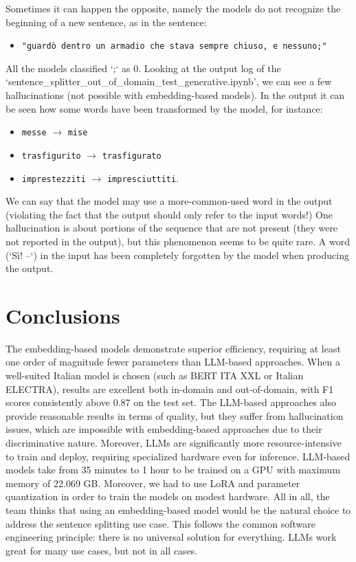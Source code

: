 \documentclass[11pt]{article}
\begin{document}
Sometimes it can happen the opposite, namely the models do not recognize the beginning of a new sentence, as in the sentence: 
\begin{itemize}
    \item \texttt{"guardò dentro un armadio che stava sempre
chiuso, e nessuno;"}
\end{itemize}
All the models classified `;` as 0.   
Looking at the output log of the `sentence\_splitter\_out\_of\_domain\_test\_generative.ipynb', we can see a few hallucinations (not possible with embedding-based models). \newline In the output it can be seen how some words have been transformed by the model, for instance:
\begin{itemize}
    \item \texttt{messe} $\rightarrow$ \texttt{mise}
    \item \texttt{trasfigurito} $\rightarrow$ \texttt{trasfigurato}
    \item \texttt{imprestezziti} $\rightarrow$ \texttt{impresciuttiti}.
\end{itemize} 
We can say that the model may use a more-common-used word in the output (violating the fact that the output should only refer to the input words!) \newline One hallucination is about portions of the sequence that are not present (they were not reported in the output), but this phenomenon seems to be quite rare. \newline A word (`Sì! –`) in the input has been completely forgotten by the model when producing the output.

\section{Conclusions}
The embedding-based models demonstrate superior efficiency, requiring at least one order of magnitude fewer parameters than LLM-based approaches. When a well-suited Italian model is chosen (such as BERT ITA XXL or Italian ELECTRA), results are excellent both in-domain and out-of-domain, with F1 scores consistently above 0.87 on the test set. \newline 
The LLM-based approaches also provide reasonable results in terms of quality, but they suffer from hallucination issues, which are impossible with embedding-based approaches due to their discriminative nature. \newline Moreover, LLMs are significantly more resource-intensive to train and deploy, requiring specialized hardware even for inference. \newline LLM-based models take from 35 minutes to 1 hour to be trained on a GPU with maximum memory of 22.069 GB. \newline Moreover, we had to use LoRA and parameter quantization in order to train the models on modest hardware. \newline All in all, the team thinks that using an embedding-based model would be the natural choice to address the sentence splitting use case. \newline This follows the common software engineering principle: there is no universal solution for everything. LLMs work great for many use cases, but not in all cases.
\end{document}

